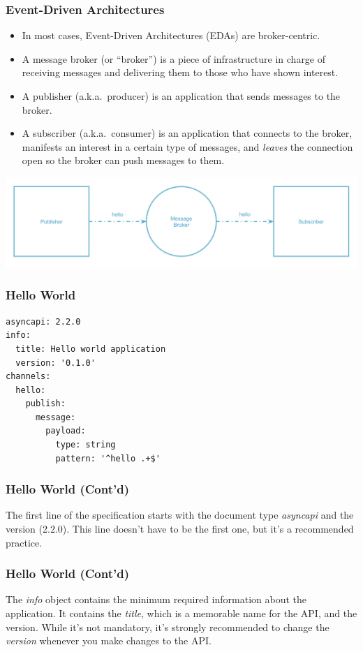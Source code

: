 \documentclass{efd-lecture}
\begin{document}
\begin{frame}
  \frametitle{Event-Driven Architectures}
  \begin{itemize}
    \item In most cases, Event-Driven Architectures (EDAs) are broker-centric.
    \item A message broker (or ``broker'') is a piece of infrastructure in charge of receiving messages and delivering them to those who have shown interest.
    \item A publisher (a.k.a.\ producer) is an application that sends messages to the broker.
    \item A subscriber (a.k.a.\ consumer) is an application that connects to the broker, manifests an interest in a certain type of messages,
      and \textit{\color{YellowOrange}leaves} the connection open so the broker can push messages to them.
  \end{itemize}
  \includegraphics[width=\textwidth]{./img/simple-event-driven.png}
\end{frame}

\begin{frame}[fragile]
  \frametitle{Hello World}
  \begin{verbatim}
asyncapi: 2.2.0
info:
  title: Hello world application
  version: '0.1.0'
channels:
  hello:
    publish:
      message:
        payload:
          type: string
          pattern: '^hello .+$'
  \end{verbatim}
\end{frame}

\begin{frame}[fragile]
  \frametitle{Hello World (Cont'd)}
  \begin{block}{}
    The first line of the specification starts with the document type \textit{\color{YellowOrange} asyncapi} and the version (2.2.0).
    This line doesn't have to be the first one,
    but it's a recommended practice.
  \end{block}
\end{frame}

\begin{frame}[fragile]
  \frametitle{Hello World (Cont'd)}
  \begin{block}{}
    The \textit{\color{YellowOrange} info} object contains the minimum required information about the application.
    It contains the \textit{\color{YellowGreen} title}, which is a memorable name for the API, and the version. While it's not mandatory,
    it's strongly recommended to change the \textit{\color{YellowGreen} version} whenever you make changes to the API\@.
  \end{block}
\end{frame}
\end{document}
